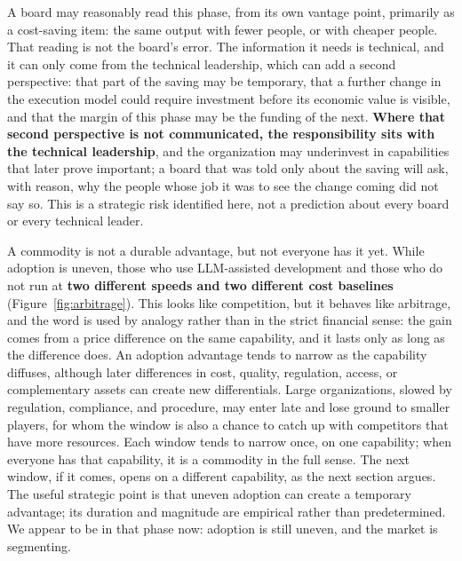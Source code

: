 \documentclass[10pt,oneside,openany]{book}
\begin{document}
A board may reasonably read this phase, from its own vantage point, primarily as a cost-saving item: the same output with fewer people, or with cheaper people. That reading is not the board's error. The information it needs is technical, and it can only come from the technical leadership, which can add a second perspective: that part of the saving may be temporary, that a further change in the execution model could require investment before its economic value is visible, and that the margin of this phase may be the funding of the next. \textbf{Where that second perspective is not communicated, the responsibility sits with the technical leadership}, and the organization may underinvest in capabilities that later prove important; a board that was told only about the saving will ask, with reason, why the people whose job it was to see the change coming did not say so. This is a strategic risk identified here, not a prediction about every board or every technical leader.

\begin{notebox}
A commodity is not a durable advantage, but not everyone has it yet. While adoption is uneven, those who use LLM-assisted development and those who do not run at \textbf{two different speeds and two different cost baselines} (Figure~\ref{fig:arbitrage}). This looks like competition, but it behaves like arbitrage, and the word is used by analogy rather than in the strict financial sense: the gain comes from a price difference on the same capability, and it lasts only as long as the difference does. An adoption advantage tends to narrow as the capability diffuses, although later differences in cost, quality, regulation, access, or complementary assets can create new differentials. Large organizations, slowed by regulation, compliance, and procedure, may enter late and lose ground to smaller players, for whom the window is also a chance to catch up with competitors that have more resources. Each window tends to narrow once, on one capability; when everyone has that capability, it is a commodity in the full sense. The next window, if it comes, opens on a different capability, as the next section argues. The useful strategic point is that uneven adoption can create a temporary advantage; its duration and magnitude are empirical rather than predetermined. We appear to be in that phase now: adoption is still uneven, and the market is segmenting.
\end{notebox}
\end{document}
